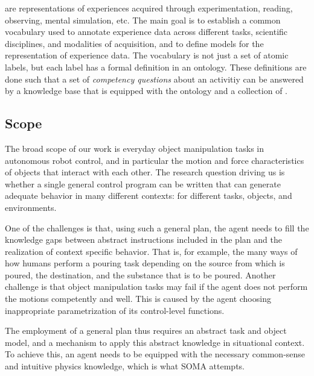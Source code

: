\neems are representations of experiences acquired through experimentation, reading, observing, mental simulation, etc.
The main goal is to establish a common vocabulary used to annotate experience data across different tasks, scientific disciplines, and modalities of acquisition, and to define models for the representation of experience data.
The vocabulary is not just a set of atomic labels, but each label has a formal definition in an ontology.
These definitions are done such that a set of \emph{competency questions} about an activitiy can be answered by a knowledge base that is equipped with the ontology and a collection of \neems.

\subsection{Scope} %
\label{sec:scope}


The broad scope of our work is everyday object manipulation tasks in autonomous robot control, and in particular the motion and force characteristics of objects that interact with each other.
The research question driving us is whether a single general control program can be written that can generate adequate behavior in many different contexts: for different tasks, objects, and environments.

One of the challenges is that, using such a general plan, the agent needs to fill the knowledge gaps between abstract instructions included in the plan and the realization of context specific behavior. That is, for example, the many ways of how humans perform a pouring task depending on the source from which is poured, the destination, and the substance that is to be poured.
Another challenge is that object manipulation tasks may fail if the agent does not perform the motions competently and well. This is caused by the agent choosing inappropriate parametrization of its control-level functions.

The employment of a general plan thus requires an abstract task and object model, and a mechanism to apply this abstract knowledge in situational context.
To achieve this, an agent needs to be equipped with the necessary common-sense and intuitive physics knowledge, which is what SOMA attempts.

